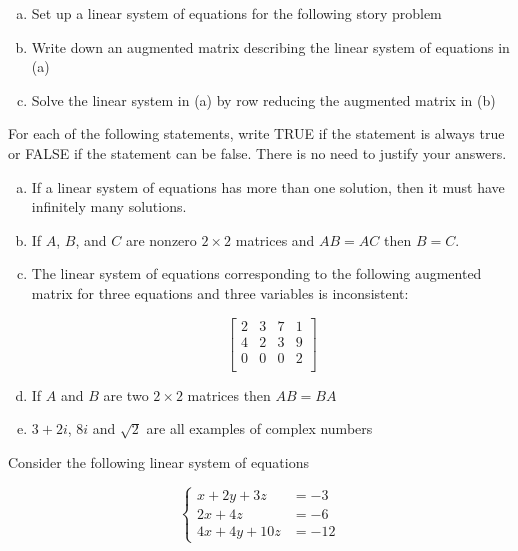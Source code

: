 \documentclass[11pt]{exam}
\theoremstyle{definition}
\begin{document}
\begin{questions}
\begin{enumerate}[(a)]
\item Set up a linear system of equations for the following story problem
\vspace{2in}
\item Write down an augmented matrix describing the linear system of equations in (a)
\vspace{1.5in}
\item Solve the linear system in (a) by row reducing the augmented matrix in (b)
\end{enumerate}

\newpage
\question[10]\mbox{}

For each of the following statements, write TRUE if the statement is always true or FALSE if the statement can be false.
There is no need to justify your answers.

\begin{enumerate}[(a)]
\item If a linear system of equations has more than one solution, then it must have infinitely many solutions.
\vspace{1.1in}
\item If $A$, $B$, and $C$ are nonzero $2\times 2$ matrices and $AB = AC$ then $B=C$.
\vspace{1.1in}
\item The linear system of equations corresponding to the following augmented matrix for three equations and three variables is inconsistent:

$$\left[\begin{array}{ccc|c}
2 & 3 & 7 & 1\\
4 & 2 & 3 & 9\\
0 & 0 & 0 & 2\\
\end{array}\right]$$
\vspace{1.1in}

\item If $A$ and $B$ are two $2\times 2$ matrices then $AB = BA$
\vspace{1.1in}

\item $3+2i$, $8i$ and $\sqrt{2}$ are all examples of complex numbers
\end{enumerate}


\newpage
\question[10]\mbox{}


Consider the following linear system of equations

$$\left\lbrace\begin{array}{cc}
x + 2y + 3z &= -3\\
2x + 4z     &=-6\\
4x +4y +  10z     &=-12
\end{array}\right.$$


\end{questions}
\end{document}
